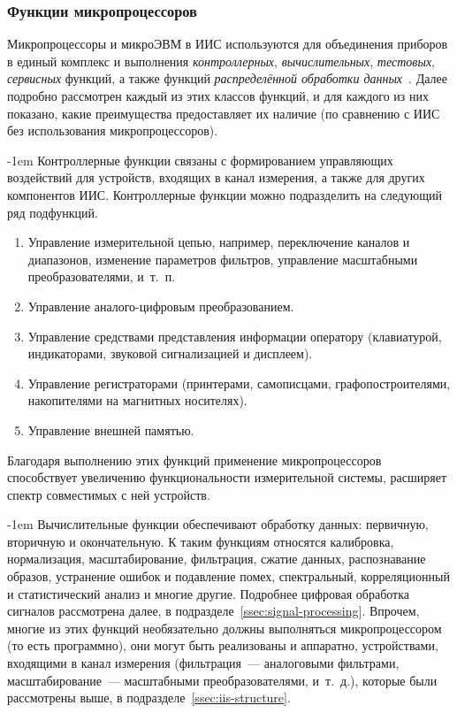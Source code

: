 \documentclass[a4paper, 14pt, titlepage]{extarticle}
\makeatletter
\newcommand{\term}[1]{\emph{#1}}
\renewcommand{\paragraph}{%
    \@startsection{paragraph}{4}%
    {\parindent}{\z@}{-1em}%
    {\normalfont\normalsize\bfseries}%
  }
\makeatother
\begin{document}
  \subsubsection{Функции микропроцессоров}\label{sssec:mcu-functions}

  Микропроцессоры и микроЭВМ в ИИС используются для объединения приборов в единый комплекс и выполнения
  \term{контроллерных}, \term{вычислительных}, \term{тестовых}, \term{сервисных} функций, а также
  функций \term{распределённой обработки данных}~\cite[с.~421]{rannev-meas-tech}.
  Далее подробно рассмотрен каждый из этих классов функций, и для каждого из них показано, какие
  преимущества предоставляет их наличие (по сравнению с ИИС без использования микропроцессоров).

  \paragraph{Контроллерные функции} связаны с формированием управляющих воздействий для устройств,
  входящих в канал измерения, а также для других компонентов ИИС. Контроллерные функции можно
  подразделить на следующий ряд подфункций.
  \begin{enumerate}
    \item Управление измерительной цепью, например, переключение каналов и диапазонов, изменение
      параметров фильтров, управление масштабными преобразователями, и~т.~п.
    \item Управление аналого-цифровым преобразованием.
    \item Управление средствами представления информации оператору (клавиатурой, индикаторами,
      звуковой сигнализацией и дисплеем).
    \item Управление регистраторами (принтерами, самописцами, графопостроителями,
      накопителями на магнитных носителях).
    \item Управление внешней памятью.
  \end{enumerate}

  Благодаря выполнению этих функций применение микропроцессоров способствует увеличению
  функциональности измерительной системы, расширяет спектр совместимых с ней устройств.

  \paragraph{Вычислительные функции} обеспечивают обработку данных: первичную, вторичную и
  окончательную. К таким функциям относятся калибровка, нормализация, масштабирование, фильтрация,
  сжатие данных, распознавание образов, устранение ошибок и подавление помех, спектральный,
  корреляционный и статистический анализ и многие другие. Подробнее цифровая обработка сигналов
  рассмотрена далее, в подразделе~\ref{ssec:signal-processing}. Впрочем, многие из этих функций
  необязательно должны выполняться микропроцессором (то есть программно), они могут быть реализованы
  и аппаратно, устройствами, входящими в канал измерения (фильтрация~--- аналоговыми фильтрами,
  масштабирование~--- масштабными преобразователями, и~т.~д.), которые были рассмотрены выше, в
  подразделе~\ref{ssec:iis-structure}.
\end{document}
